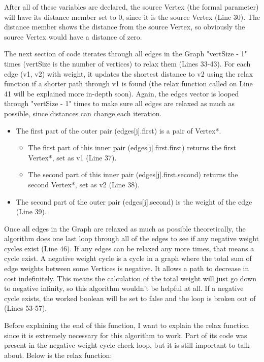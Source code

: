 \documentclass[letterpaper, 10pt]{article}
\begin{document}
\noindent
After all of these variables are declared, the source Vertex (the formal parameter) will have its distance member set to 0, since it is the source Vertex (Line 30). The distance member shows the distance from the source Vertex, so obviously the source Vertex would have a distance of zero.

\vspace{1em}
\noindent
The next section of code iterates through all edges in the Graph "vertSize - 1" times (vertSize is the number of vertices) to relax them (Lines 33-43). For each edge (v1, v2) with weight, it updates the shortest distance to v2 using the relax function if a shorter path through v1 is found (the relax function called on Line 41 will be explained more in-depth soon). Again, the edges vector is looped through "vertSize - 1" times to make sure all edges are relaxed as much as possible, since distances can change each iteration.
\begin{itemize}
    \item The first part of the outer pair (edges[j].first) is a pair of Vertex*.
    \begin{itemize}
        \item The first part of this inner pair (edges[j].first.first) returns the first Vertex*, set as v1 (Line 37).
        \item The second part of this inner pair (edges[j].first.second) returns the second Vertex*, set as v2 (Line 38).
    \end{itemize}
    \item The second part of the outer pair (edges[j].second) is the weight of the edge (Line 39).
\end{itemize}

\noindent
Once all edges in the Graph are relaxed as much as possible theoretically, the algorithm does one last loop through all of the edges to see if any negative weight cycles exist (Line 46). If any edges can be relaxed any more times, that means a cycle exist. A negative weight cycle is a cycle in a graph where the total sum of edge weights between some Vertices is negative. It allows a path to decrease in cost indefinitely. This means the calculation of the total weight will just go down to negative infinity, so this algorithm wouldn't be helpful at all. If a negative cycle exists, the worked boolean will be set to false and the loop is broken out of (Lines 53-57).

\vspace{1em}
\noindent
Before explaining the end of this function, I want to explain the relax function since it is extremely necessary for this algorithm to work. Part of its code was present in the negative weight cycle check loop, but it is still important to talk about. Below is the relax function:
\end{document}
